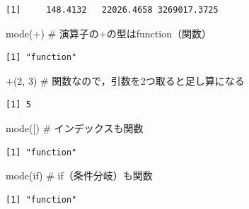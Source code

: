 \documentclass[
  letterpaper,
  DIV=11,
  numbers=noendperiod]{scrreprt}
\newenvironment{Shaded}{\begin{snugshade}}{\end{snugshade}}
\newcommand{\AttributeTok}[1]{\textcolor[rgb]{0.40,0.45,0.13}{#1}}
\newcommand{\CommentTok}[1]{\textcolor[rgb]{0.37,0.37,0.37}{#1}}
\newcommand{\DecValTok}[1]{\textcolor[rgb]{0.68,0.00,0.00}{#1}}
\newcommand{\FunctionTok}[1]{\textcolor[rgb]{0.28,0.35,0.67}{#1}}
\newcommand{\NormalTok}[1]{\textcolor[rgb]{0.00,0.23,0.31}{#1}}
\newcommand{\StringTok}[1]{\textcolor[rgb]{0.13,0.47,0.30}{#1}}
\begin{document}
\begin{verbatim}
[1]     148.4132   22026.4658 3269017.3725
\end{verbatim}

\begin{Shaded}
\begin{Highlighting}[]
\FunctionTok{mode}\NormalTok{(}\StringTok{\textasciigrave{}}\AttributeTok{+}\StringTok{\textasciigrave{}}\NormalTok{) }\CommentTok{\# 演算子の+の型はfunction（関数）}
\end{Highlighting}
\end{Shaded}

\begin{verbatim}
[1] "function"
\end{verbatim}

\begin{Shaded}
\begin{Highlighting}[]
\StringTok{\textasciigrave{}}\AttributeTok{+}\StringTok{\textasciigrave{}}\NormalTok{(}\DecValTok{2}\NormalTok{, }\DecValTok{3}\NormalTok{) }\CommentTok{\# 関数なので，引数を2つ取ると足し算になる}
\end{Highlighting}
\end{Shaded}

\begin{verbatim}
[1] 5
\end{verbatim}

\begin{Shaded}
\begin{Highlighting}[]
\FunctionTok{mode}\NormalTok{(}\StringTok{\textasciigrave{}}\AttributeTok{[}\StringTok{\textasciigrave{}}\NormalTok{) }\CommentTok{\# インデックスも関数}
\end{Highlighting}
\end{Shaded}

\begin{verbatim}
[1] "function"
\end{verbatim}

\begin{Shaded}
\begin{Highlighting}[]
\FunctionTok{mode}\NormalTok{(}\StringTok{\textasciigrave{}}\AttributeTok{if}\StringTok{\textasciigrave{}}\NormalTok{) }\CommentTok{\# if（条件分岐）も関数}
\end{Highlighting}
\end{Shaded}

\begin{verbatim}
[1] "function"
\end{verbatim}
\end{document}
